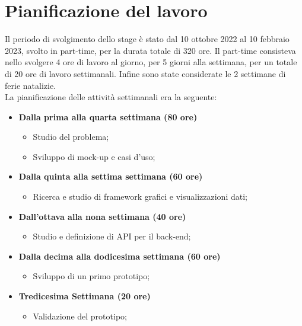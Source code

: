 \section{Pianificazione del lavoro}
Il periodo di svolgimento dello stage è stato dal 10 ottobre 2022 al 10 febbraio 2023, svolto in part-time, per la durata totale di 320 ore. Il part-time consisteva nello svolgere 4 ore di lavoro al giorno, per 5 giorni alla settimana, per un totale di 20 ore di lavoro settimanali.
Infine sono state considerate le 2 settimane di ferie natalizie.
\\
La pianificazione delle attività settimanali era la seguente:
  \begin{itemize}
	
        \item[] \textbf{Dalla prima alla quarta settimana (80 ore)} 
	\begin{itemize}
            	\item{Studio del problema};
	 	\item{Sviluppo di mock-up e casi d'uso};
	\end{itemize}
       

        \item[] \textbf{Dalla quinta alla settima settimana (60 ore)} 
	\begin{itemize}
            	\item{Ricerca e studio di framework grafici e visualizzazioni dati};
	 	
	\end{itemize}
        
	\item[] \textbf{Dall'ottava alla nona settimana (40 ore)}
	\begin{itemize}
            	\item {Studio e definizione di \gls{API} per il back-end};
	\end{itemize}
        
       \item[] \textbf{Dalla decima alla dodicesima settimana (60 ore)} 
	\begin{itemize}
            	\item {Sviluppo di un primo prototipo};
	\end{itemize}
        
        \item[] \textbf{Tredicesima Settimana (20 ore)} 
	\begin{itemize}
            	\item{Validazione del prototipo};
	 	

\end{itemize}
\end{itemize}
